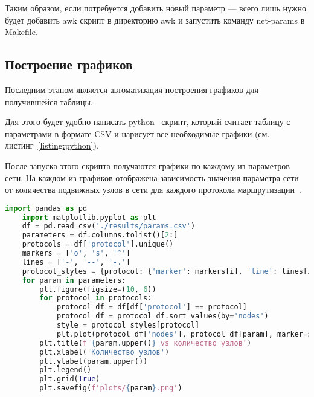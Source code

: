 Таким образом, если потребуется добавить новый параметр --- всего лишь нужно будет добавить awk скрипт в директорию awk и запустить команду net-params в Makefile.

\subsection{Построение графиков}

Последним этапом является автоматизация построения графиков для получившейся таблицы.

Для этого будет удобно написать python~\cite{python} скрипт, который считает таблицу с параметрами в формате CSV и нарисует все необходимые графики (см. листинг~\ref{listing:python}).

После запуска этого скрипта получаются графики по каждому из параметров сети. На каждом из графиков отображена зависимость значения параметра сети от количества подвижных узлов в сети для каждого протокола маршрутизации~\cite{sarao2018comparison}.

\begin{lstlisting}[language=python, style=mystyle, caption=Python скрипт для построения графиков, label=listing:python]
    import pandas as pd
    import matplotlib.pyplot as plt
    df = pd.read_csv('./results/params.csv')
    parameters = df.columns.tolist()[2:]
    protocols = df['protocol'].unique()
    markers = ['o', 's', '^']
    lines = ['-', '--', '-.']
    protocol_styles = {protocol: {'marker': markers[i], 'line': lines[i]} for i, protocol in enumerate(protocols)}
    for param in parameters:
        plt.figure(figsize=(10, 6))
        for protocol in protocols:
            protocol_df = df[df['protocol'] == protocol]
            protocol_df = protocol_df.sort_values(by='nodes')
            style = protocol_styles[protocol]
            plt.plot(protocol_df['nodes'], protocol_df[param], marker=style['marker'], linestyle=style['line'], label=protocol)
        plt.title(f'{param.upper()} vs количество узлов')
        plt.xlabel('Количество узлов')
        plt.ylabel(param.upper())
        plt.legend()
        plt.grid(True)
        plt.savefig(f'plots/{param}.png') 
\end{lstlisting}